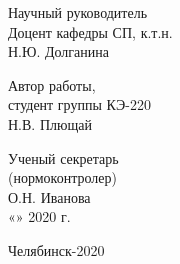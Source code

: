 \begin{titlepage}
    \hfill
    \begin{minipage}{0.4\textwidth}
        Научный руководитель\\
        Доцент кафедры СП, к.т.н.\\
        \underline{\hspace{2cm}} Н.Ю. Долганина\\
    \end{minipage}
    \bigskip
    \vfill

    \hfill
    \begin{minipage}{0.4\textwidth}
        Автор работы,\\
        студент группы КЭ-220\\
        \underline{\hspace{2cm}} Н.В. Плющай\\
    \end{minipage}
    \bigskip
    \vfill

    \hfill
    \begin{minipage}{0.4\textwidth}
        Ученый секретарь\\
        (нормоконтролер)\\
        \underline{\hspace{2cm}} О.Н. Иванова\\
        «\underline{\hspace{0.7cm}}» \underline{\hspace{2cm}} 2020 г.
    \end{minipage}
    \bigskip
    \vfill

    \begin{center}
        Челябинск-2020
    \end{center}
\end{titlepage}
